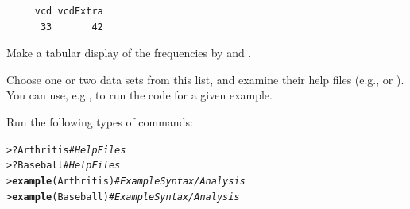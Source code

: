 \documentclass[11pt]{report}\usepackage[]{graphicx}\usepackage[]{color}
\makeatletter
\newcommand{\hlcom}[1]{\textcolor[rgb]{0.678,0.584,0.686}{\textit{#1}}}%
\newcommand{\hlopt}[1]{\textcolor[rgb]{0,0,0}{#1}}%
\newcommand{\hlstd}[1]{\textcolor[rgb]{0.345,0.345,0.345}{#1}}%
\newcommand{\hlkwd}[1]{\textcolor[rgb]{0.737,0.353,0.396}{\textbf{#1}}}%
\newenvironment{kframe}{%
 \def\at@end@of@kframe{}%
 \ifinner\ifhmode%
  \def\at@end@of@kframe{\end{minipage}}%
  \begin{minipage}{\columnwidth}%
 \fi\fi%
 \def\FrameCommand##1{\hskip\@totalleftmargin \hskip-\fboxsep
 \colorbox{shadecolor}{##1}\hskip-\fboxsep
     \hskip-\linewidth \hskip-\@totalleftmargin \hskip\columnwidth}%
 \MakeFramed {\advance\hsize-\width
   \@totalleftmargin\z@ \linewidth\hsize
   \@setminipage}}%
 {\par\unskip\endMakeFramed%
 \at@end@of@kframe}
\newenvironment{knitrout}{}{} %
\renewenvironment{knitrout}{\small\renewcommand{\baselinestretch}{.85}}{} %
\makeatother
\begin{document}
\begin{Exercises}
\begin{enumerate*}
\begin{ans}
\begin{knitrout}
\begin{kframe}
\begin{verbatim}
     vcd vcdExtra 
      33       42 
\end{verbatim}
\end{kframe}
\end{knitrout}
    \end{ans}
    
    
    \item Make a tabular display of the frequencies by  and .
    
    
    \item Choose one or two data sets from this list, and examine their help files
    (e.g.,  or ).  You can use, e.g.,
     to run the \R code for a given example.
    \begin{ans}
    Run the following types of commands:
\begin{knitrout}
\color{fgcolor}\begin{kframe}
\begin{alltt}
\hlstd{> }\hlopt{?}\hlstd{Arthritis}          \hlcom{#Help Files}
\hlstd{> }\hlopt{?}\hlstd{Baseball}           \hlcom{#Help Files}
\hlstd{> }\hlkwd{example}\hlstd{(Arthritis)}  \hlcom{#Example Syntax/Analysis}
\hlstd{> }\hlkwd{example}\hlstd{(Baseball)}   \hlcom{#Example Syntax/Analysis}
\end{alltt}
\end{kframe}
\end{knitrout}
    \end{ans}
    
    
  \end{enumerate*}


\end{Exercises}
\end{document}

